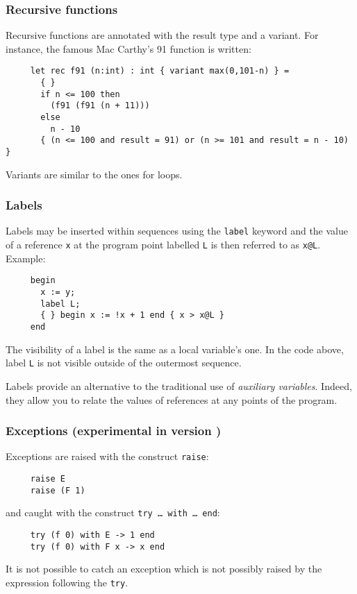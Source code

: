 \documentclass[a4paper,12pt]{report}
\newcommand{\te}[1]{\texttt{#1}}
\begin{document}
\subsubsection{Recursive functions}
Recursive functions are annotated with the result type and a variant.
For instance, the famous Mac Carthy's 91 function is written:
\begin{verbatim}
     let rec f91 (n:int) : int { variant max(0,101-n) } =
       { }
       if n <= 100 then
         (f91 (f91 (n + 11)))
       else
         n - 10
       { (n <= 100 and result = 91) or (n >= 101 and result = n - 10) }
\end{verbatim}
Variants are similar to the ones for loops.

\subsubsection{Labels}
Labels may be inserted within sequences using the 
\te{label} keyword and the value of a reference \texttt{x} at the
program point labelled \texttt{L} is then referred to as \texttt{x@L}.
Example:
\begin{verbatim}
     begin 
       x := y;
       label L; 
       { } begin x := !x + 1 end { x > x@L }
     end
\end{verbatim}
The visibility of a label is the same as a local variable's one. In
the code above, label \texttt{L} is not visible outside of the
outermost sequence.

Labels provide an alternative to the traditional use of
\emph{auxiliary variables}. Indeed, they
allow you to relate the values of references at any points of the
program. 


\subsubsection{Exceptions (experimental in version \whyversion)}
\label{exception}

Exceptions are raised with the construct \texttt{raise}:
\begin{verbatim}
     raise E
     raise (F 1)
\end{verbatim}
and caught with the construct \texttt{try \dots\ with \dots\ end}:
\begin{verbatim}
     try (f 0) with E -> 1 end 
     try (f 0) with F x -> x end
\end{verbatim}
It is not possible to catch an exception which is not possibly raised
by the expression following the \texttt{try}.
\end{document}
